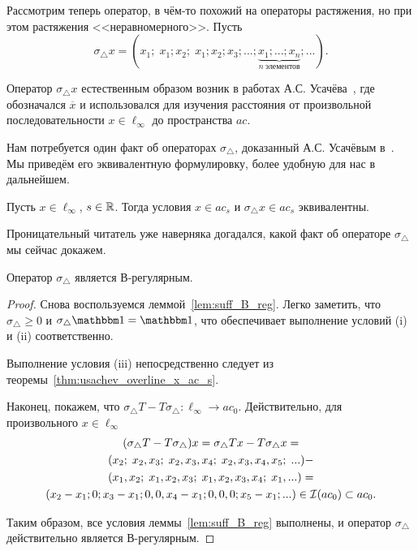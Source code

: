 Рассмотрим теперь оператор,
в чём-то похожий на операторы растяжения,
но при этом растяжения <<неравномерного>>.
Пусть
\begin{equation}
	\sigma_\triangle x =
	(x_1; \; x_1; x_2; \; x_1; x_2; x_3; ... ; \underbrace{x_1; ...; x_n}_{n~\mbox{элементов}}; ...)
	.
\end{equation}

\begin{remark}
	Оператор $\sigma_\triangle x$ естественным образом возник в работах А.С. Усачёва~\cite{usachev2009_phd_vsu},
	где обозначался $\overline{x}$ и
	использовался для изучения расстояния от произвольной последовательности $x\in\ell_\infty$
	до пространства $ac$.
\end{remark}

Нам потребуется один факт об операторах $\sigma_\triangle$,
доказанный А.С. Усачёвым в~\cite[теорема 19]{usachev2009_phd_vsu}.
Мы приведём его эквивалентную формулировку, более удобную для нас в дальнейшем.

\begin{theorem}
	\label{thm:usachev_overline_x_ac_s}
	Пусть $x\in\ell_\infty$, $s\in\mathbb{R}$.
	Тогда условия $x\in ac_s$ и $\sigma_\triangle x \in ac_s$ эквивалентны.
\end{theorem}

Проницательный читатель уже наверняка догадался,
какой факт об операторе $\sigma_\triangle$ мы сейчас докажем.

\begin{theorem}
	Оператор $\sigma_\triangle$ является В-регулярным.
\end{theorem}

\begin{proof}
	Снова воспользуемся леммой~\ref{lem:suff_B_reg}.
	Легко заметить, что $\sigma_\triangle \geq 0$ и $\sigma_\triangle \one  = \one$,
	что обеспечивает выполнение условий (i) и (ii) соответственно.

	Выполнение условия (iii) непосредственно следует из теоремы~\ref{thm:usachev_overline_x_ac_s}.

	Наконец, покажем, что $\sigma_\triangle T - T \sigma_\triangle  : \ell_\infty \to ac_0$.
	Действительно, для произвольного $x\in\ell_\infty$
	\begin{multline}
	(\sigma_\triangle T - T \sigma_\triangle)x =
	\sigma_\triangle Tx - T \sigma_\triangle x =
	\\
	(x_2; \; x_2, x_3; \; x_2, x_3,   x_4; \; x_2, x_3, x_4, x_5; \; ... )-
	\\
	(x_1, x_2; \; x_1,    x_2, x_3; \; x_1,   x_2, x_3, x_4; \; x_1, ... )=
	\\
	(x_2-x_1; 0; x_3-x_1; 0, 0, x_4-x_1; 0,0,0; x_5-x_1; ...) \in\mathcal{I}(ac_0)\subset ac_0
	.
	\end{multline}

	Таким образом, все условия леммы~\ref{lem:suff_B_reg} выполнены,
	и оператор $\sigma_\triangle$ действительно является В-регулярным.
\end{proof}

